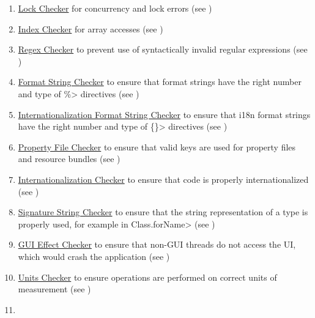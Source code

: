 \begin{enumerate}
\item
  \hyperref[lock-checker]{Lock Checker} for concurrency and lock errors
  (see )
\item
  \hyperref[index-checker]{Index Checker} for array accesses
  (see )
\item
  \hyperref[regex-checker]{Regex Checker} to prevent use of syntactically
  invalid regular expressions (see )
\item
  \hyperref[formatter-checker]{Format String Checker} to ensure that format
  strings have the right number and type of \<\%> directives (see
  )
\item
  \hyperref[i18n-formatter-checker]{Internationalization Format String Checker}
  to ensure that i18n format strings have the right number and type of
  \<\{\}> directives (see )
\item
  \hyperref[propkey-checker]{Property File Checker} to ensure that valid
  keys are used for property files and resource bundles (see
  )
\item
  \hyperref[i18n-checker]{Internationalization Checker} to
  ensure that code is properly internationalized (see
  )
\item
  \hyperref[signature-checker]{Signature String Checker} to ensure that the
  string representation of a type is properly used, for example in
  \<Class.forName> (see )
\item
  \hyperref[guieffect-checker]{GUI Effect Checker} to ensure that non-GUI
  threads do not access the UI, which would crash the application
  (see )
\item
  \hyperref[units-checker]{Units Checker} to ensure operations are
  performed on correct units of measurement
  (see )
\item

\end{enumerate}
